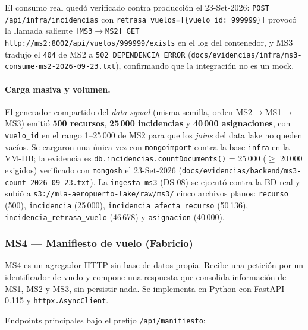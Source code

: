 El consumo real quedó verificado contra producción el 23-Set-2026:
\texttt{POST /api/infra/incidencias} con
\texttt{retrasa\_vuelos=[\{vuelo\_id: 999999\}]} provocó la llamada
saliente \texttt{[MS3$\to$MS2] GET http://ms2:8002/api/vuelos/999999/exists}
en el log del contenedor, y MS3 tradujo el \texttt{404} de MS2 a
\texttt{502 DEPENDENCIA\_ERROR}
(\texttt{docs/evidencias/infra/ms3-consume-ms2-2026-09-23.txt}),
confirmando que la integración no es un mock.

\paragraph{Carga masiva y volumen.}
El generador compartido del \emph{data squad} (misma semilla, orden
MS2$\to$MS1$\to$MS3) emitió \textbf{500 recursos}, \textbf{25\,000
incidencias} y \textbf{40\,000 asignaciones}, con \texttt{vuelo\_id} en
el rango 1--25\,000 de MS2 para que los \emph{joins} del data lake no
queden vacíos. Se cargaron una única vez con \texttt{mongoimport} contra
la base \texttt{infra} en la VM-DB; la evidencia es
\texttt{db.incidencias.countDocuments()} = 25\,000 ($\geq$ 20\,000
exigidos) verificado con \texttt{mongosh} el 23-Set-2026
(\texttt{docs/evidencias/backend/ms3-count-2026-09-23.txt}).
La \texttt{ingesta-ms3} (DS-08) se ejecutó contra la BD real y subió a
\texttt{s3://mla-aeropuerto-lake/raw/ms3/} cinco archivos planos:
\texttt{recurso} (500), \texttt{incidencia} (25\,000),
\texttt{incidencia\_afecta\_recurso} (50\,136),
\texttt{incidencia\_retrasa\_vuelo} (46\,678) y \texttt{asignacion}
(40\,000).


\subsubsection{MS4 --- Manifiesto de vuelo (Fabricio)}
MS4 es un agregador HTTP sin base de datos propia. Recibe una petición
por un identificador de vuelo y compone una respuesta que consolida
información de MS1, MS2 y MS3, sin persistir nada. Se implementa en
Python con FastAPI 0.115 y \texttt{httpx.AsyncClient}.

Endpoints principales bajo el prefijo \texttt{/api/manifiesto}:

